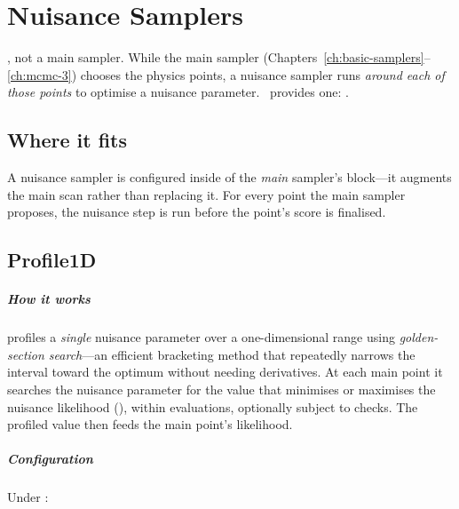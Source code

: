 \chapter{Nuisance Samplers}
\label{ch:nuisance}

, not a main sampler. While the main sampler
(Chapters~\ref{ch:basic-samplers}--\ref{ch:mcmc-3}) chooses the physics points, a nuisance sampler
runs \emph{around each of those points} to optimise a nuisance parameter. \Jarvis\ provides one:
.

\section{Where it fits}
\label{sec:nui-where}

A nuisance sampler is configured inside  of the \emph{main} sampler's
block---it augments the main scan rather than replacing it. For every point the main sampler
proposes, the nuisance step is run before the point's score is finalised.

\section{Profile1D}
\label{sec:s-profile1d}

\paragraph{How it works}  profiles a \emph{single} nuisance parameter over a
one-dimensional range using \emph{golden-section search}---an efficient bracketing method that
repeatedly narrows the interval toward the optimum without needing derivatives. At each main point
it searches the nuisance parameter for the value that minimises or maximises the nuisance
likelihood (), within  evaluations, optionally subject to
 checks. The profiled value then feeds the main point's likelihood.

\paragraph{Configuration} Under :

